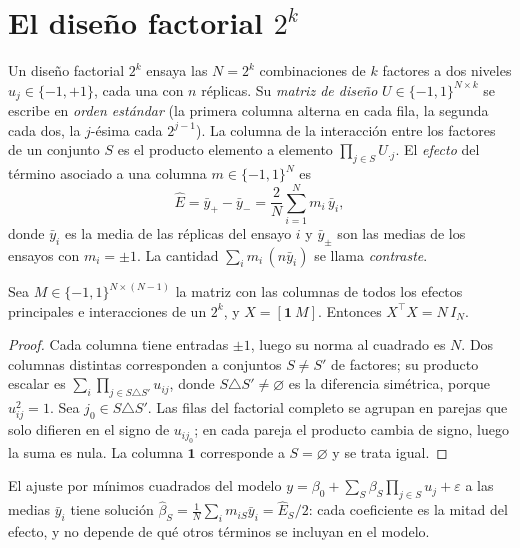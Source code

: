 \section{El diseño factorial \texorpdfstring{$2^k$}{2\^{}k}}

\begin{definicion}\label{def:factorial}
Un diseño factorial $2^k$ ensaya las $N=2^k$ combinaciones de $k$ factores a dos niveles $u_j\in\{-1,+1\}$, cada una con $n$ réplicas. Su \emph{matriz de diseño} $U\in\{-1,1\}^{N\times k}$ se escribe en \emph{orden estándar} (la primera columna alterna en cada fila, la segunda cada dos, la $j$-ésima cada $2^{j-1}$). La columna de la interacción entre los factores de un conjunto $S$ es el producto elemento a elemento $\prod_{j\in S}U_{\cdot j}$. El \emph{efecto} del término asociado a una columna $m\in\{-1,1\}^{N}$ es
\[
\hat E=\bar y_{+}-\bar y_{-}=\frac{2}{N}\sum_{i=1}^{N}m_i\,\bar y_i,
\]
donde $\bar y_i$ es la media de las réplicas del ensayo $i$ y $\bar y_{\pm}$ son las medias de los ensayos con $m_i=\pm1$. La cantidad $\sum_i m_i\,(n\bar y_i)$ se llama \emph{contraste}.
\end{definicion}

\begin{proposicion}[Ortogonalidad]\label{prop:ortogonal}
Sea $M\in\{-1,1\}^{N\times(N-1)}$ la matriz con las columnas de todos los efectos principales e interacciones de un $2^k$, y $X=[\mathbf 1\ M]$. Entonces $X^\top X=N\,I_N$.
\end{proposicion}

\begin{proof}
Cada columna tiene entradas $\pm1$, luego su norma al cuadrado es $N$. Dos columnas distintas corresponden a conjuntos $S\ne S'$ de factores; su producto escalar es $\sum_i\prod_{j\in S\triangle S'}u_{ij}$, donde $S\triangle S'\ne\varnothing$ es la diferencia simétrica, porque $u_{ij}^2=1$. Sea $j_0\in S\triangle S'$. Las filas del factorial completo se agrupan en parejas que solo difieren en el signo de $u_{ij_0}$; en cada pareja el producto cambia de signo, luego la suma es nula. La columna $\mathbf 1$ corresponde a $S=\varnothing$ y se trata igual.
\end{proof}

\begin{corolario}\label{cor:coeficientes}
El ajuste por mínimos cuadrados del modelo $y=\beta_0+\sum_{S}\beta_S\prod_{j\in S}u_j+\varepsilon$ a las medias $\bar y_i$ tiene solución $\hat\beta_S=\frac1N\sum_i m_{iS}\bar y_i=\hat E_S/2$: cada coeficiente es la mitad del efecto, y no depende de qué otros términos se incluyan en el modelo.
\end{corolario}

